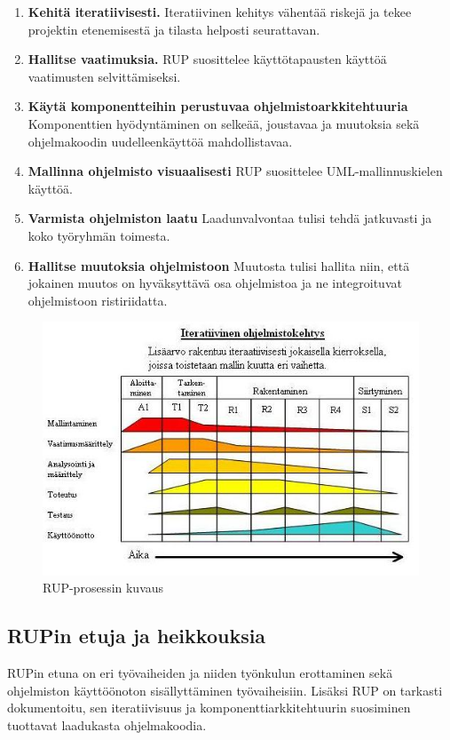 \documentclass[finnish,12pt]{tktltiki2}
\theoremstyle{definition}
\theoremstyle{remark}
\begin{document}
\begin{enumerate}
\item \textbf{Kehitä iteratiivisesti.} Iteratiivinen kehitys vähentää riskejä ja tekee projektin etenemisestä ja tilasta helposti seurattavan.
\item \textbf{Hallitse vaatimuksia.} RUP suosittelee käyttötapausten käyttöä vaatimusten selvittämiseksi.
\item \textbf{Käytä komponentteihin perustuvaa ohjelmistoarkkitehtuuria} Komponenttien hyödyntäminen on selkeää, joustavaa ja muutoksia sekä ohjelmakoodin uudelleenkäyttöä mahdollistavaa.
\item \textbf{Mallinna ohjelmisto visuaalisesti} RUP suosittelee UML-mallinnuskielen käyttöä.
\item \textbf{Varmista ohjelmiston laatu} Laadunvalvontaa tulisi tehdä jatkuvasti ja koko työryhmän toimesta.
\item \textbf{Hallitse muutoksia ohjelmistoon} Muutosta tulisi hallita niin, että jokainen muutos on hyväksyttävä osa ohjelmistoa ja ne integroituvat ohjelmistoon ristiriidatta.
\end{enumerate}

\begin{figure}[ht!]
\centering
{}
\includegraphics[width=150mm]{RUP.jpg}
\caption{RUP-prosessin kuvaus}
\label{overflow}
\end{figure}

\subsection{RUPin etuja ja heikkouksia}

RUPin etuna on eri työvaiheiden ja niiden työnkulun erottaminen sekä ohjelmiston käyttöönoton sisällyttäminen työvaiheisiin\cite{Sommerville10}. Lisäksi RUP on tarkasti dokumentoitu, sen iteratiivisuus ja komponenttiarkkitehtuurin suosiminen tuottavat laadukasta ohjelmakoodia.
\end{document}
